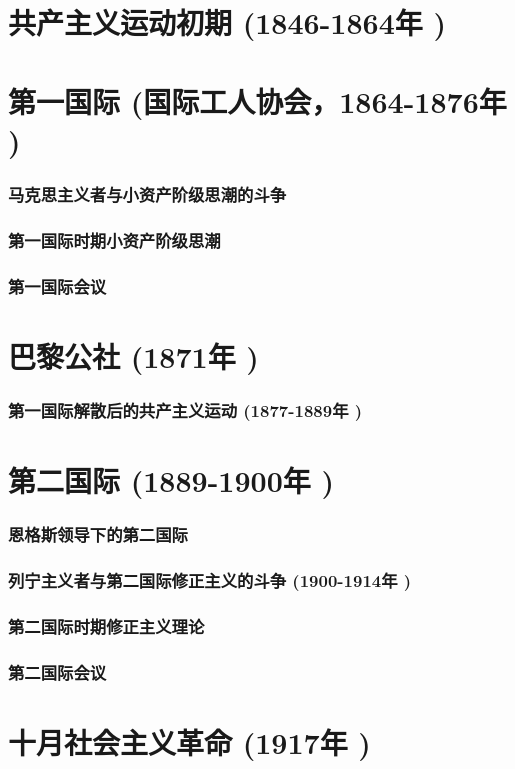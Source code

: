 \documentclass[UTF8]{../RepresentationUniverse}
\begin{document}
\section{共产主义运动初期 (1846-1864年 )}
\section{第一国际 (国际工人协会，1864-1876年 )}
    \subsubsection{马克思主义者与小资产阶级思潮的斗争}
    \subsubsection{第一国际时期小资产阶级思潮}
    \subsubsection{第一国际会议}

\section{巴黎公社 (1871年 )}
    \subsubsection{第一国际解散后的共产主义运动 (1877-1889年 )}

\section{第二国际 (1889-1900年 )}
    \subsubsection{恩格斯领导下的第二国际}
    \subsubsection{列宁主义者与第二国际修正主义的斗争 (1900-1914年 )}
    \subsubsection{第二国际时期修正主义理论}
    \subsubsection{第二国际会议}

\section{十月社会主义革命 (1917年 )}
\end{document}

